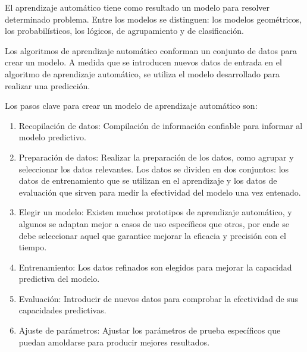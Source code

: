 El aprendizaje automático tiene como resultado un modelo para resolver determinado problema. Entre los modelos se distinguen: los modelos geométricos, los probabilísticos, los lógicos, de agrupamiento y de clasificación.  


Los algoritmos de aprendizaje automático conforman un conjunto de datos para crear un modelo. A medida que se introducen nuevos datos de entrada en el algoritmo de aprendizaje automático, se utiliza el modelo desarrollado para realizar una predicción.  


Los pasos clave para crear un modelo de aprendizaje automático son:  
\begin{enumerate}
    \item Recopilación de datos: Compilación de información confiable para informar al modelo predictivo.
    \item Preparación de datos: Realizar la preparación de los datos, como agrupar y seleccionar los datos relevantes. Los datos se dividen en dos conjuntos: los datos de entrenamiento que se utilizan en el aprendizaje y los datos de evaluación que sirven para medir la efectividad del modelo una vez entenado.
    \item Elegir un modelo: Existen muchos prototipos de aprendizaje automático, y algunos se adaptan mejor a casos de uso específicos que otros, por ende se debe seleccionar aquel que garantice mejorar la eficacia y precisión con el tiempo.
    \item Entrenamiento: Los datos refinados son elegidos para mejorar la capacidad predictiva del modelo.
    \item Evaluación: Introducir de nuevos datos para comprobar la efectividad de sus capacidades predictivas.
    \item Ajuste de parámetros: Ajustar los parámetros de prueba específicos que puedan amoldarse para producir mejores resultados.
\end{enumerate}
    
